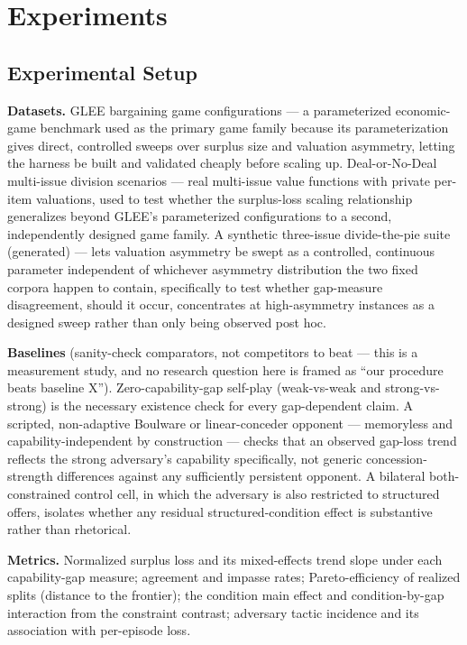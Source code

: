 \documentclass[11pt]{article}
\begin{document}
\section{Experiments}

\subsection{Experimental Setup}

\textbf{Datasets.} GLEE bargaining game configurations \citep{GLEE2410} --- a parameterized economic-game benchmark used as the primary game family because its parameterization gives direct, controlled sweeps over surplus size and valuation asymmetry, letting the harness be built and validated cheaply before scaling up. Deal-or-No-Deal multi-issue division scenarios \citep{DealOrNoDeal1706} --- real multi-issue value functions with private per-item valuations, used to test whether the surplus-loss scaling relationship generalizes beyond GLEE's parameterized configurations to a second, independently designed game family. A synthetic three-issue divide-the-pie suite (generated) --- lets valuation asymmetry be swept as a controlled, continuous parameter independent of whichever asymmetry distribution the two fixed corpora happen to contain, specifically to test whether gap-measure disagreement, should it occur, concentrates at high-asymmetry instances as a designed sweep rather than only being observed post hoc.

\textbf{Baselines} (sanity-check comparators, not competitors to beat --- this is a measurement study, and no research question here is framed as ``our procedure beats baseline X''). Zero-capability-gap self-play (weak-vs-weak and strong-vs-strong) is the necessary existence check for every gap-dependent claim. A scripted, non-adaptive Boulware or linear-conceder opponent --- memoryless and capability-independent by construction --- checks that an observed gap-loss trend reflects the strong adversary's capability specifically, not generic concession-strength differences against any sufficiently persistent opponent. A bilateral both-constrained control cell, in which the adversary is also restricted to structured offers, isolates whether any residual structured-condition effect is substantive rather than rhetorical.

\textbf{Metrics.} Normalized surplus loss and its mixed-effects trend slope under each capability-gap measure; agreement and impasse rates; Pareto-efficiency of realized splits (distance to the frontier); the condition main effect and condition-by-gap interaction from the constraint contrast; adversary tactic incidence and its association with per-episode loss.
\end{document}
